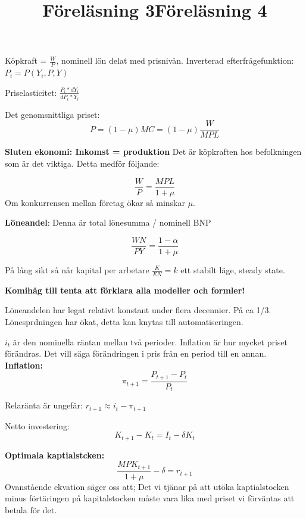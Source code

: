 \documentclass{article}
\begin{document}
\par
 
 \vspace{5mm}
 \title{Föreläsning 3}
 \vspace{5mm}
 
\par \noindent
Köpkraft = $\frac{W}{P}$, nominell lön delat med prisnivån.
Inverterad efterfrågefunktion: $P_i = P(Y_i,P,Y)$ \par \noindent

Priselasticitet: $\frac{P_i*dY_i}{dP_i*Y_i}$

Det genomsnittliga priset: 
$$
P = (1-\mu)MC = (1-\mu)\frac{W}{MPL}
$$

\textbf{Sluten ekonomi: Inkomst = produktion}
Det är köpkraften hos befolkningen som är det viktiga. Detta medför följande: 

$$
 \frac{W}{P} = \frac{MPL}{1+\mu}
$$
Om konkurrensen mellan företag ökar så minskar $ \mu$. \par \noindent

\textbf{Löneandel}: Denna är total lönesumma / nominell BNP 

$$
\frac{WN}{PY} = \frac{1-\alpha}{1+\mu}
$$

På lång sikt så når kapital per arbetare $ \frac{K}{EN} = k $ ett stabilt läge, steady state. 

\textbf{Komihåg till tenta att förklara alla modeller och formler!}

Löneandelen har legat relativt konstant under flera decennier. På ca 1/3. 
Lönesprdningen har ökat, detta kan knytas till automatiseringen. 

\vspace{5mm}
\title{Föreläsning 4} \par \noindent
\vspace{5mm}

$i_t$ är den nominella räntan mellan två perioder. Inflation är hur mycket priset förändras. Det vill säga förändringen i pris från en period till en annan. 
\textbf{Inflation: }
$$
\pi_{t+1} = \frac{P_{t+1}-P_t}{P_t}
$$

Relaränta är ungefär: $r_{t+1} \approx i_t - \pi_{t+1}$

Netto investering: 
$$
K_{t+1} - K_t = I_t -\delta K_t 
$$

\textbf{Optimala kaptialstcken: }
$$
\frac{MPK_{t+1}}{1+\mu}-\delta = r_{t+1}
$$
Ovanstående ekvation säger oss att; Det vi tjänar på att utöka kaptialstocken minus förtäringen på kapitalstocken måste vara lika med priset vi förväntas att betala för det. 
\end{document}

